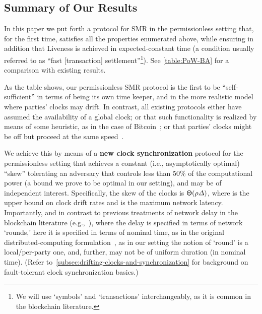 \subsection{Summary of Our Results}
\label{subsec:our-results}

In this paper we put forth a protocol for SMR in the permissionless setting that, for the first time, satisfies all the properties enumerated above, while ensuring in addition that Liveness is achieved in expected-constant time (a condition usually referred to as ``fast [transaction] settlement''\footnote{We will use `symbols' and `transactions' interchangeably, as it is common in the blockchain literature.}).
%
See \cref{table:PoW-BA} for a comparison with existing results.



As the table shows, our permissionless SMR protocol is the first to be ``self-sufficient'' in terms of being its own time keeper, and in the more realistic model where parties' clocks may drift.
%
In contrast, all existing protocols either have assumed the availability of a global clock; or that such functionality is realized by means of some heuristic, as in the case of Bitcoin~\cite{EPRINT:GarKiaLeo20}; or that parties' clocks might be off but proceed at the same speed~\cite{TCC:GarKiaShe22}.

We achieve this by means of a \textbf{new clock synchronization} protocol for the permissionless setting that achieves a constant (i.e., asymptotically optimal) ``skew'' tolerating an adversary that controls less than $50\%$ of the computational power (a bound we prove to be optimal in our setting), and may be of independent interest.
%
Specifically, the skew of the clocks is $\mathsf{\Theta}(\rho \varDelta)$, where \clockDrift is the upper bound on clock drift rates and \delay is the maximum network latency.
%
Importantly, and in contrast to previous treatments of network delay in the blockchain literature (e.g.,~\cite{EC:PasSeeshe17,C:BMTZ17,EPRINT:GarKiaLeo20,EPRINT:CEMMPS20}), where the delay is specified in terms of network `rounds,' here it is specified in terms of nominal time, as in the original distributed-computing formulation~\cite{JACM:DwoLynSto88}, as in our setting the notion of `round' is a local/per-party one, and, further, may not be of uniform duration (in nominal time).
%
(Refer to~\cref{subsec:drifting-clocks-and-synchronization} for background on fault-tolerant clock synchronization basics.)


